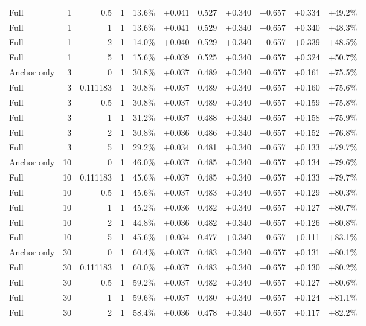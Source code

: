 \begin{table}[htbp]
\begin{tabular}{lrrrccccccc}
Full & 1 & 0.5 & 1 & 13.6\% & +0.041 & 0.527 & +0.340 & +0.657 & +0.334 & +49.2\% \\
Full & 1 & 1 & 1 & 13.6\% & +0.041 & 0.529 & +0.340 & +0.657 & +0.340 & +48.3\% \\
Full & 1 & 2 & 1 & 14.0\% & +0.040 & 0.529 & +0.340 & +0.657 & +0.339 & +48.5\% \\
Full & 1 & 5 & 1 & 15.6\% & +0.039 & 0.525 & +0.340 & +0.657 & +0.324 & +50.7\% \\
Anchor only & 3 & 0 & 1 & 30.8\% & +0.037 & 0.489 & +0.340 & +0.657 & +0.161 & +75.5\% \\
Full & 3 & 0.111183 & 1 & 30.8\% & +0.037 & 0.489 & +0.340 & +0.657 & +0.160 & +75.6\% \\
Full & 3 & 0.5 & 1 & 30.8\% & +0.037 & 0.489 & +0.340 & +0.657 & +0.159 & +75.8\% \\
Full & 3 & 1 & 1 & 31.2\% & +0.037 & 0.488 & +0.340 & +0.657 & +0.158 & +75.9\% \\
Full & 3 & 2 & 1 & 30.8\% & +0.036 & 0.486 & +0.340 & +0.657 & +0.152 & +76.8\% \\
Full & 3 & 5 & 1 & 29.2\% & +0.034 & 0.481 & +0.340 & +0.657 & +0.133 & +79.7\% \\
Anchor only & 10 & 0 & 1 & 46.0\% & +0.037 & 0.485 & +0.340 & +0.657 & +0.134 & +79.6\% \\
Full & 10 & 0.111183 & 1 & 45.6\% & +0.037 & 0.485 & +0.340 & +0.657 & +0.133 & +79.7\% \\
Full & 10 & 0.5 & 1 & 45.6\% & +0.037 & 0.483 & +0.340 & +0.657 & +0.129 & +80.3\% \\
Full & 10 & 1 & 1 & 45.2\% & +0.036 & 0.482 & +0.340 & +0.657 & +0.127 & +80.7\% \\
Full & 10 & 2 & 1 & 44.8\% & +0.036 & 0.482 & +0.340 & +0.657 & +0.126 & +80.8\% \\
Full & 10 & 5 & 1 & 45.6\% & +0.034 & 0.477 & +0.340 & +0.657 & +0.111 & +83.1\% \\
Anchor only & 30 & 0 & 1 & 60.4\% & +0.037 & 0.483 & +0.340 & +0.657 & +0.131 & +80.1\% \\
Full & 30 & 0.111183 & 1 & 60.0\% & +0.037 & 0.483 & +0.340 & +0.657 & +0.130 & +80.2\% \\
Full & 30 & 0.5 & 1 & 59.2\% & +0.037 & 0.482 & +0.340 & +0.657 & +0.127 & +80.6\% \\
Full & 30 & 1 & 1 & 59.6\% & +0.037 & 0.480 & +0.340 & +0.657 & +0.124 & +81.1\% \\
Full & 30 & 2 & 1 & 58.4\% & +0.036 & 0.478 & +0.340 & +0.657 & +0.117 & +82.2\% \\

\end{tabular}
\end{table}
